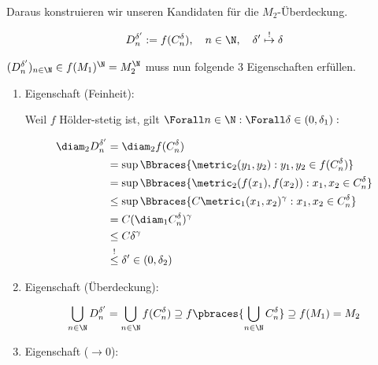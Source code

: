 \begin{solution}
Daraus konstruieren wir unseren Kandidaten für die $M_2$-Überdeckung.

\begin{align*}
    D_n^{\delta^\prime} := f(C_n^\delta),
    \quad
    n \in \N,
    \quad
    \delta^\prime
    \stackrel{!}{\mapsto}
    \delta
\end{align*}

$(D_n^{\delta^\prime})_{n \in \N} \in f(M_1)^\N = M_2^\N$ muss nun folgende $3$ Eigenschaften erfüllen.

\begin{enumerate}[label = \arabic*.]

    \item Eigenschaft (Feinheit):
    
    Weil $f$ Hölder-stetig ist, gilt $\Forall n \in \N: \Forall \delta \in (0, \delta_1):$

    \begin{align*}
        \diam_2 D_n^{\delta^\prime}
        & =
        \diam_2 f(C_n^\delta) \\
        & =
        \sup \Bbraces{\metric_2(y_1, y_2): y_1, y_2 \in f(C_n^\delta)} \\
        & =
        \sup \Bbraces{\metric_2(f(x_1), f(x_2)): x_1, x_2 \in C_n^\delta} \\
        & \leq
        \sup \Bbraces{C \metric_1(x_1, x_2)^\gamma: x_1, x_2 \in C_n^\delta} \\
        & =
        C (\diam_1 C_n^\delta)^\gamma \\
        & \leq
        C \delta^\gamma \\
        & \stackrel{!}{\leq}
        \delta^\prime
        \in (0, \delta_2)
    \end{align*}

    \item Eigenschaft (Überdeckung):
    
    \begin{align*}
        \bigcup_{n \in \N}
            D_n^{\delta^\prime}
        =
        \bigcup_{n \in \N}
            f(C_n^\delta)
        \supseteq
        f
        \pbraces
        {
            \bigcup_{n \in \N}
                C_n^\delta
        }
        \supseteq
        f(M_1)
        =
        M_2
    \end{align*}

    \item Eigenschaft ($\to 0$):
    

\end{enumerate}
\end{solution}
